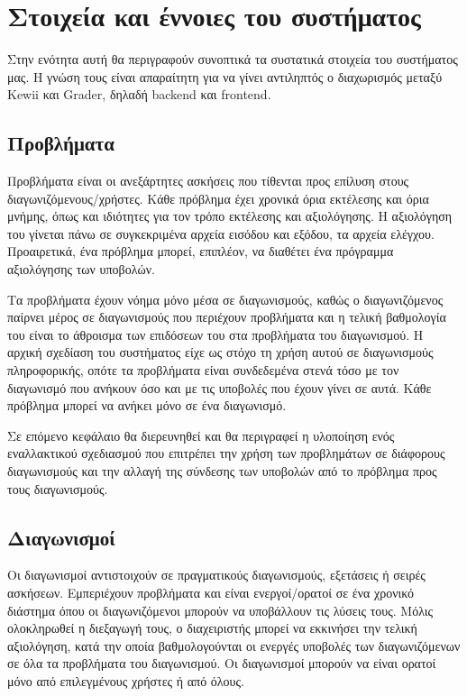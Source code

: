 \documentclass[diploma]{softlab-thesis}
\begin{document}
\section{Στοιχεία και έννοιες του συστήματος}

Στην ενότητα αυτή θα περιγραφούν συνοπτικά τα συστατικά στοιχεία του συστήματος
μας. Η γνώση τους είναι απαραίτητη για να γίνει αντιληπτός ο διαχωρισμός μεταξύ
Kewii και Grader, δηλαδή backend και frontend.

\subsection{Προβλήματα}

Προβλήματα είναι οι ανεξάρτητες ασκήσεις που τίθενται προς επίλυση στους
διαγωνιζόμενους/χρήστες. Κάθε πρόβλημα έχει χρονικά όρια εκτέλεσης και όρια
μνήμης, όπως και ιδιότητες για τον τρόπο εκτέλεσης και αξιολόγησης. Η
αξιολόγηση του γίνεται πάνω σε συγκεκριμένα αρχεία εισόδου και εξόδου, τα
αρχεία ελέγχου. Προαιρετικά, ένα πρόβλημα μπορεί, επιπλέον, να διαθέτει ένα
πρόγραμμα αξιολόγησης των υποβολών.

\bigskip

Τα προβλήματα έχουν νόημα μόνο μέσα σε διαγωνισμούς, καθώς ο διαγωνιζόμενος
παίρνει μέρος σε διαγωνισμούς που περιέχουν προβλήματα και η τελική βαθμολογία
του είναι το άθροισμα των επιδόσεων του στα προβλήματα του διαγωνισμού. Η
αρχική σχεδίαση του συστήματος είχε ως στόχο τη χρήση αυτού σε διαγωνισμούς
πληροφορικής, οπότε τα προβλήματα είναι συνδεδεμένα στενά τόσο με τον
διαγωνισμό που ανήκουν όσο και με τις υποβολές που έχουν γίνει σε αυτά. Κάθε
πρόβλημα μπορεί να ανήκει μόνο σε ένα διαγωνισμό.

\bigskip

Σε επόμενο κεφάλαιο θα διερευνηθεί και θα περιγραφεί η υλοποίηση ενός εναλλακτικού
σχεδιασμού που επιτρέπει την χρήση των προβλημάτων σε διάφορους διαγωνισμούς και
την αλλαγή της σύνδεσης των υποβολών από το πρόβλημα προς τους διαγωνισμούς.

\subsection{Διαγωνισμοί}

Οι διαγωνισμοί αντιστοιχούν σε πραγματικούς διαγωνισμούς, εξετάσεις ή σειρές
ασκήσεων. Εμπεριέχουν προβλήματα και είναι ενεργοί/ορατοί σε ένα χρονικό
διάστημα όπου οι διαγωνιζόμενοι μπορούν να υποβάλλουν τις λύσεις τους. Μόλις
ολοκληρωθεί η διεξαγωγή τους, ο διαχειριστής μπορεί να εκκινήσει την τελική
αξιολόγηση, κατά την οποία βαθμολογούνται οι ενεργές υποβολές των
διαγωνιζόμενων σε όλα τα προβλήματα του διαγωνισμού. Οι διαγωνισμοί μπορούν να
είναι ορατοί μόνο από επιλεγμένους χρήστες ή από όλους.
\end{document}
